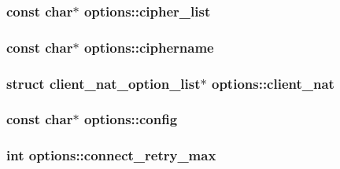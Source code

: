 \subsubsection[{cipher\+\_\+list}]{\setlength{\rightskip}{0pt plus 5cm}const char$\ast$ options\+::cipher\+\_\+list}\label{structoptions_abd58a7a4b0ea3e30121218d08ba6c9f9}
\hypertarget{structoptions_a7f09235fee401590074265aff177491a}{}
\subsubsection[{ciphername}]{\setlength{\rightskip}{0pt plus 5cm}const char$\ast$ options\+::ciphername}\label{structoptions_a7f09235fee401590074265aff177491a}
\hypertarget{structoptions_ade749cc08a84dbbc8f866beab247aad0}{}
\subsubsection[{client\+\_\+nat}]{\setlength{\rightskip}{0pt plus 5cm}struct {\bf client\+\_\+nat\+\_\+option\+\_\+list}$\ast$ options\+::client\+\_\+nat}\label{structoptions_ade749cc08a84dbbc8f866beab247aad0}
\hypertarget{structoptions_ab10b9cdcad048c3ef63cdae7ffd09444}{}
\subsubsection[{config}]{\setlength{\rightskip}{0pt plus 5cm}const char$\ast$ options\+::config}\label{structoptions_ab10b9cdcad048c3ef63cdae7ffd09444}
\hypertarget{structoptions_a8cf8cffcea3a27764644702bc382d35c}{}
\subsubsection[{connect\+\_\+retry\+\_\+max}]{\setlength{\rightskip}{0pt plus 5cm}int options\+::connect\+\_\+retry\+\_\+max}\label{structoptions_a8cf8cffcea3a27764644702bc382d35c}
\hypertarget{structoptions_a111f57f3a14727b141dc4d359cc02ea2}{}
